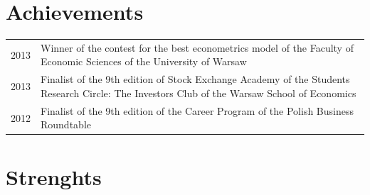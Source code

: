 \documentclass{cls/gml_cv_sets}
\begin{document}
\begin{paracol}{2}
\begin{minipage}[t]{0.6\textwidth}
    \section{Achievements}
    \begin{tabular}{>{\footnotesize}r >{\footnotesize}p{}}
        2013 & Winner of the contest for the best econometrics model of the 
        Faculty of Economic Sciences of the University of Warsaw \\
        2013 & Finalist of the 9th edition of Stock Exchange Academy of the 
        Students Research Circle: The Investors Club of the Warsaw School of 
        Economics \\
        2012 & Finalist of the 9th edition of the Career Program of the 
        Polish Business Roundtable
    \end{tabular}
\end{minipage}
\vspace{-1em}

\section{Strenghts}
\begin{center}
\end{center}

\clearpage
\end{paracol}
\end{document}
